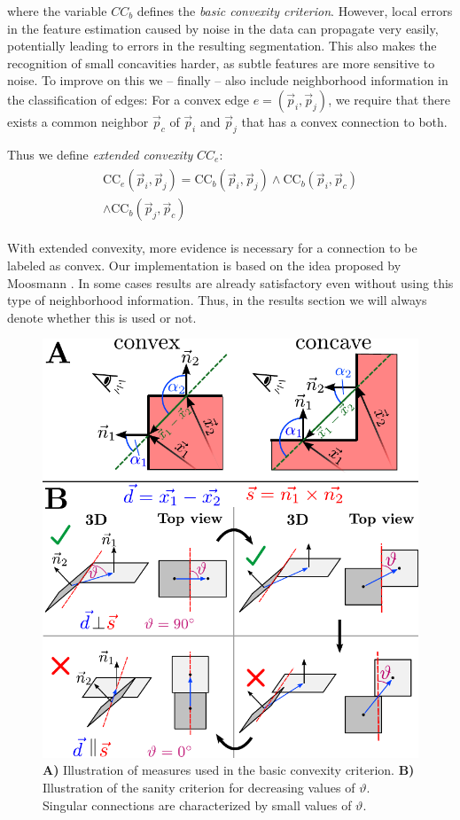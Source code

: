 where the variable $CC_b$ defines the {\em basic convexity criterion}. However, local errors in the feature estimation caused by noise in the data can propagate very easily, potentially leading to errors in the resulting segmentation. This also makes the recognition of small concavities harder, as subtle features are more sensitive to noise. To improve on this we -- finally -- also include neighborhood information in the classification of edges: For a convex edge $e=(\vec p_i, \vec p_j)$, we require that there exists a common neighbor $\vec p_c$ of $\vec p_i$ and $\vec p_j$ that has a convex connection to both.

Thus we define \textit{extended convexity} $CC_e$:
\begin{align}
  \begin{aligned}
   \text{CC}_e (\vec p_i, \vec p_j) = \text{CC}_b(\vec p_i, \vec p_j) \land \text{CC}_b(\vec p_i, \vec p_c) \\ \land \text{CC}_b(\vec p_j, \vec p_c)
  \end{aligned}
\end{align}

With extended convexity, more evidence is necessary for a connection to be labeled as convex. Our implementation is based on the idea proposed by Moosmann \cite{Moosmann_Phdthesis}. In some cases results are already satisfactory even without using this type of neighborhood information. Thus, in the results section we will always denote whether this is used or not.\\

\begin{figure}[!ht]
 \centering
 \includegraphics[width=0.7\linewidth]{figures/CVPR2014/algorithmic_details}
 \caption[Convexity Measures]{ \textbf{A)} Illustration of measures used in the basic convexity criterion. \textbf{B)} Illustration of the sanity criterion for decreasing values of $\vartheta$. Singular connections are characterized by small values of $\vartheta$.}
 \label{fig:details}
\end{figure}

